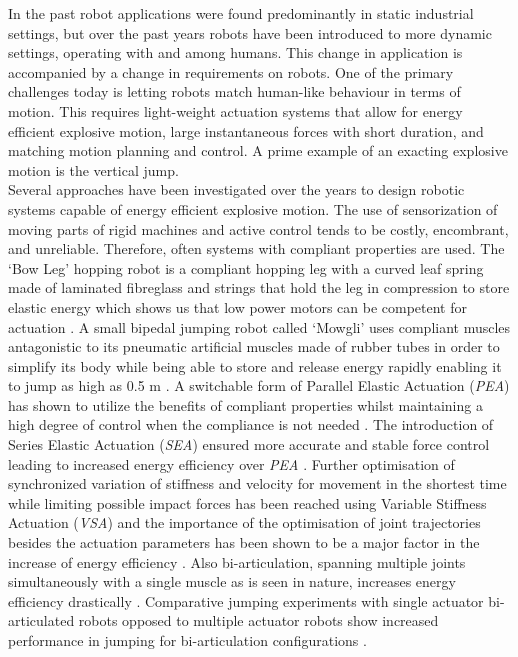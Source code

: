 \documentclass[letterpaper, 10 pt, conference]{ieeeconf}  %
\begin{document}
In the past robot applications were found predominantly in static industrial settings, but over the past years robots have been introduced to more dynamic settings, operating with and among humans. This change in application is accompanied by a change in requirements on robots. One of the primary challenges today is letting robots match human-like behaviour in terms of motion. This requires light-weight actuation systems that allow for energy efficient explosive motion, large  instantaneous  forces  with  short  duration, and matching motion planning and control. A prime example of an exacting explosive motion is the vertical jump.
\\
Several approaches have been investigated over the years to design robotic systems capable of energy efficient explosive motion. The use of sensorization of moving parts of rigid machines and active control tends to be costly, encombrant, and unreliable. Therefore, often systems with compliant properties are used. The `Bow Leg' hopping robot is a compliant hopping leg with a curved leaf spring made of laminated fibreglass and strings that hold the leg in compression to store elastic energy which shows us that low power motors  can  be  competent  for  actuation \cite{zeglin1999bow}. A small bipedal jumping robot called `Mowgli' uses compliant muscles antagonistic to its pneumatic artificial muscles made of rubber tubes in order to simplify its body while being able to store and release energy rapidly enabling it to jump as high as 0.5 m \cite{niiyama2007mowgli}. A switchable form of Parallel Elastic Actuation (\textit{PEA}) has shown to utilize the benefits of compliant properties whilst maintaining a high degree of control when the compliance is not needed \cite{liu2015spear}. The introduction of Series Elastic Actuation (\textit{SEA}) ensured more accurate and stable force control leading to increased energy efficiency over \textit{PEA} \cite{pratt1995series,yesilevskiy2015comparison}.
Further optimisation of synchronized variation of stiffness and velocity for movement
in the shortest time while limiting possible impact forces has been reached using Variable Stiffness Actuation (\textit{VSA}) \cite{garabini2011optimality} and the importance of the optimisation of joint trajectories besides the actuation parameters has been shown to be a major factor in the increase of energy efficiency \cite{velasco2013soft}. Also bi-articulation, spanning multiple joints simultaneously with a single muscle as is seen in nature, increases energy efficiency drastically \cite{schenau1989rotation,prilutsky1994tendon}. Comparative jumping experiments with single actuator bi-articulated robots opposed to multiple actuator robots show increased performance in jumping for bi-articulation configurations \cite{oshima2007jumping,babivc2009biarticulated,hyon2002development}. \\
\end{document}
